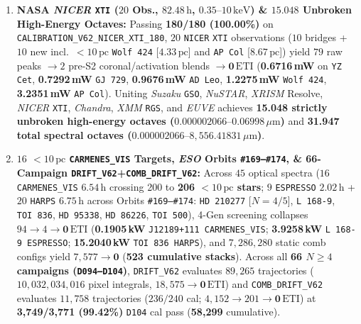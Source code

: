 \documentclass[twocolumn,10pt]{article}
\begin{document}
\begin{enumerate}
  \item \textbf{NASA \textit{NICER} \texttt{XTI} ($20$ Obs., $82.48\,\text{h}$, $0.35\text{--}10\,\mathrm{keV}$) \& $15.048$ Unbroken High-Energy Octaves:} Passing \textbf{180/180 (100.00\%)} on \texttt{CALIBRATION\_V62\_NICER\_XTI\_180}, $20$ \texttt{NICER} \texttt{XTI} observations ($10$ bridges + $10$ new incl.\ $<10\,\text{pc}$ \texttt{Wolf\,424} [$4.33\,\text{pc}$] and \texttt{AP\,Col} [$8.67\,\text{pc}$]) yield $79$ raw peaks $\rightarrow 2$ pre-S2 coronal/activation blends $\rightarrow \mathbf{0\,\mathrm{ETI}}$ (\textbf{0.6716\,mW} on \texttt{YZ\,Cet}, \textbf{0.7292\,mW} \texttt{GJ\,729}, \textbf{0.9676\,mW} \texttt{AD\,Leo}, \textbf{1.2275\,mW} \texttt{Wolf\,424}, \textbf{3.2351\,mW} \texttt{AP\,Col}). Uniting \textit{Suzaku} \texttt{GSO}, \textit{NuSTAR}, \textit{XRISM} Resolve, \textit{NICER} \texttt{XTI}, \textit{Chandra}, \textit{XMM} \texttt{RGS}, and \textit{EUVE} achieves \textbf{15.048 strictly unbroken high-energy octaves ($0.000002066\text{--}0.06998\,\mu\text{m}$)} and \textbf{31.947 total spectral octaves ($0.000002066\text{--}8{,}556.41831\,\mu\text{m}$)}.
  \item \textbf{$16$ $<10\,\text{pc}$ \texttt{CARMENES\_VIS} Targets, \textit{ESO} Orbits \texttt{\#169--\#174}, \& 66-Campaign \texttt{DRIFT\_V62}+\texttt{COMB\_DRIFT\_V62}:} Across $45$ optical spectra ($16$ \texttt{CARMENES\_VIS} $6.54\,\text{h}$ crossing 200 to \textbf{206 $<10\,\text{pc}$ stars}; $9$ \texttt{ESPRESSO} $2.02\,\text{h}$ + $20$ \texttt{HARPS} $6.75\,\text{h}$ across Orbits \texttt{\#169--\#174}: \texttt{HD\,210277} [$N=4/5$], \texttt{L\,168-9}, \texttt{TOI\,836}, \texttt{HD\,95338}, \texttt{HD\,86226}, \texttt{TOI\,500}), 4-Gen screening collapses $94\rightarrow 4\rightarrow \mathbf{0\,\mathrm{ETI}}$ (\textbf{0.1905\,kW} \texttt{J12189+111 CARMENES\_VIS}; \textbf{3.9258\,kW} \texttt{L\,168-9 ESPRESSO}; \textbf{15.2040\,kW} \texttt{TOI\,836 HARPS}), and $7{,}286{,}280$ static comb configs yield $7{,}577\rightarrow \mathbf{0}$ (\textbf{523 cumulative stacks}). Across all \textbf{66 $N\ge 4$ campaigns (\texttt{D094--D104})}, \texttt{DRIFT\_V62} evaluates $89{,}265$ trajectories ($10{,}032{,}034{,}016$ pixel integrals, $18{,}575\rightarrow \mathbf{0\,\mathrm{ETI}}$) and \texttt{COMB\_DRIFT\_V62} evaluates $11{,}758$ trajectories ($236/240$ cal; $4{,}152\rightarrow 201\rightarrow \mathbf{0\,\mathrm{ETI}}$) at \textbf{3,749/3,771 (99.42\%)} \texttt{D104} cal pass (\textbf{58,299} cumulative).
\end{enumerate}
\end{document}
